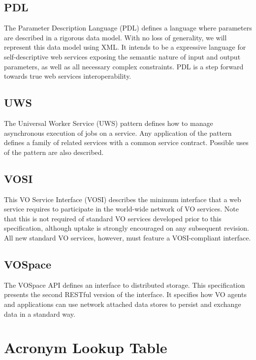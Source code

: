 \documentclass[11pt,letter]{ivoa}
\begin{document}
{\subsection{PDL}

The Parameter Description Language (PDL) \citep{2014ivoa.spec.0523Z} defines a language where parameters are described in a 
rigorous data model. With no loss of generality, we will represent this data model using 
XML. It intends to be a expressive language for self-descriptive web services exposing 
the semantic nature of input and output parameters, as well as all necessary complex 
constraints. PDL is a step forward towards true web services interoperability. 
 
\subsection{UWS} 

The Universal Worker Service (UWS) \citep{2016ivoa.spec.1024H} pattern defines how to manage asynchronous execution 
of jobs on a service. Any application of the pattern defines a family of related services 
with a common service contract. Possible uses of the pattern are also described. 

\subsection{VOSI} 

This VO Service Interface (VOSI) \citep{2017ivoa.spec.0524G} describes the minimum interface that a web service requires to 
participate in the world-wide network of VO services. Note that this is not required of 
standard VO services developed prior to this specification, although uptake is strongly 
encouraged on any subsequent revision. All new standard VO services, however, must feature 
a VOSI-compliant interface. 

\subsection{VOSpace}

The VOSpace \citep{2018ivoa.spec.0621G} API defines an interface to distributed storage. This specification presents the 
second RESTful version of the interface. It specifies how VO agents and applications can 
use network attached data stores to persist and exchange data in a standard way. 

\pagebreak
\section{Acronym Lookup Table}

}
\end{document}
